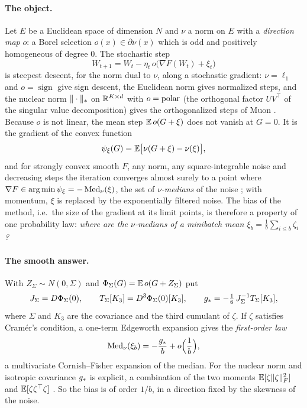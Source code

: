 \documentclass[anon,12pt]{colt2026}
\begin{document}
\paragraph{The object.} Let $E$ be a Euclidean space of dimension $N$ and $\nu$ a norm on $E$ with a \emph{direction
map} $o$: a Borel selection $o(x)\in\partial\nu(x)$ which is odd and positively homogeneous of degree $0$. The
stochastic step
\[
W_{t+1}=W_t-\eta_t\,o\big(\nabla F(W_t)+\xi_t\big)
\]
is steepest descent, for the norm dual to $\nu$, along a stochastic gradient: $\nu=\ell_1$ and $o=\operatorname{sign}$ give
sign descent, the Euclidean norm gives normalized steps, and the nuclear norm $\|\cdot\|_{*}$ on $\mathbb{R}^{K\times d}$ with
$o=\operatorname{polar}$ (the orthogonal factor $UV^\top$ of the singular value decomposition) gives the orthogonalized steps of Muon
\citep{jordan2024muon,bernstein2024old,carlson2015stochastic}. Because $o$ is not linear, the mean step
$\mathbb{E}\,o(G+\xi)$ does not vanish at $G=0$. It is the gradient of the convex function
\[
\psi_\xi(G)=\mathbb{E}\big[\nu(G+\xi)-\nu(\xi)\big],
\]
and for strongly convex smooth $F$, any norm, any square-integrable noise and decreasing steps the iteration
converges almost surely to a point where $\nabla F\in\arg\min\psi_\xi=-\operatorname{Med}_\nu(\xi)$, the set of \emph{$\nu$-medians}
of the noise \citep{companionI}; with momentum, $\xi$ is replaced by the exponentially filtered noise. The bias of
the method, i.e.\ the size of the gradient at its limit points, is therefore a property of one probability law: \emph{where
are the $\nu$-medians of a minibatch mean $\xi_b=\frac1b\sum_{i\le b}\zeta_i$?}

\paragraph{The smooth answer.} With $Z_\Sigma\sim N(0,\Sigma)$ and $\Phi_\Sigma(G)=\mathbb{E}\,o(G+Z_\Sigma)$ put
\begin{equation}\label{eq:gstar}
J_\Sigma=D\Phi_\Sigma(0),\qquad T_\Sigma[K_3]=D^3\Phi_\Sigma(0)[K_3],\qquad g_\ast=-\tfrac16\,J_\Sigma^{-1}T_\Sigma[K_3],
\end{equation}
where $\Sigma$ and $K_3$ are the covariance and the third cumulant of $\zeta$. If $\zeta$ satisfies Cram\'er's
condition, a one-term Edgeworth expansion gives the \emph{first-order law}
\begin{equation}\label{eq:law}
\operatorname{Med}_\nu(\xi_b)=-\frac{g_\ast}b+o\Big(\frac1b\Big),
\end{equation}
a multivariate Cornish--Fisher expansion \citep{cornish1938moments} of the median. For the nuclear norm and isotropic
covariance $g_\ast$ is explicit, a combination of the two moments $\mathbb{E}[\zeta\|\zeta\|_{F}^2]$ and $\mathbb{E}[\zeta\zeta^\top\zeta]$
\citep{companionI}. So the bias is of order $1/b$, in a direction fixed by the skewness of the noise.
\end{document}
